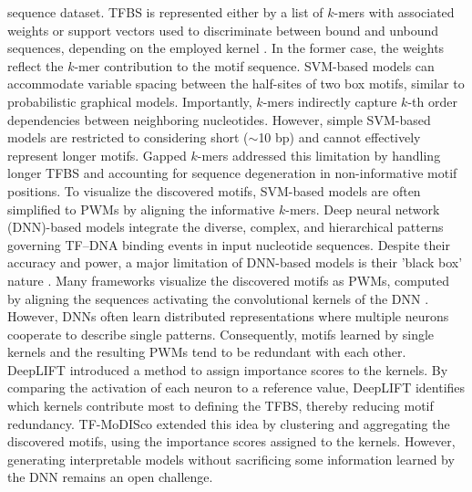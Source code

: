 \documentclass[a4paper, titlepage, openright]{book}
\begin{document}
sequence dataset. TFBS is represented either by a list of $k$-mers with associated weights or support vectors used to discriminate between bound and unbound sequences, depending on the employed kernel \citep{boeva2016analysis}. In the former case, the weights reflect the $k$-mer contribution to the motif sequence. SVM-based models can accommodate variable spacing between the half-sites of two box motifs, similar to probabilistic graphical models. Importantly, $k$-mers indirectly capture $k$-th order dependencies between neighboring nucleotides. However, simple SVM-based models are restricted to considering short ($\sim$10 bp) and cannot effectively represent longer motifs. Gapped $k$-mers \citep{ghandi2014robust} addressed this limitation by handling longer TFBS and accounting for sequence degeneration in non-informative motif positions. To visualize the discovered motifs, SVM-based models are often simplified to PWMs by aligning the informative $k$-mers. Deep neural network (DNN)-based models integrate the diverse, complex, and hierarchical patterns governing TF–DNA binding events in input nucleotide sequences. Despite their accuracy and power, a major limitation of DNN-based models is their 'black box' nature \citep{park2020enhancing}. Many frameworks visualize the discovered motifs as PWMs, computed by aligning the sequences activating the convolutional kernels of the DNN \citep{koo2020deep}. However, DNNs often learn distributed representations where multiple neurons cooperate to describe single patterns. Consequently, motifs learned by single kernels and the resulting PWMs tend to be redundant with each other. DeepLIFT \citep{shrikumar2017learning} introduced a method to assign importance scores to the kernels. By comparing the activation of each neuron to a reference value, DeepLIFT identifies which kernels contribute most to defining the TFBS, thereby reducing motif redundancy. TF-MoDISco \citep{avsec2021base} extended this idea by clustering and aggregating the discovered motifs, using the importance scores assigned to the kernels. However, generating interpretable models without sacrificing some information learned by the DNN remains an open challenge.

\end{document}
